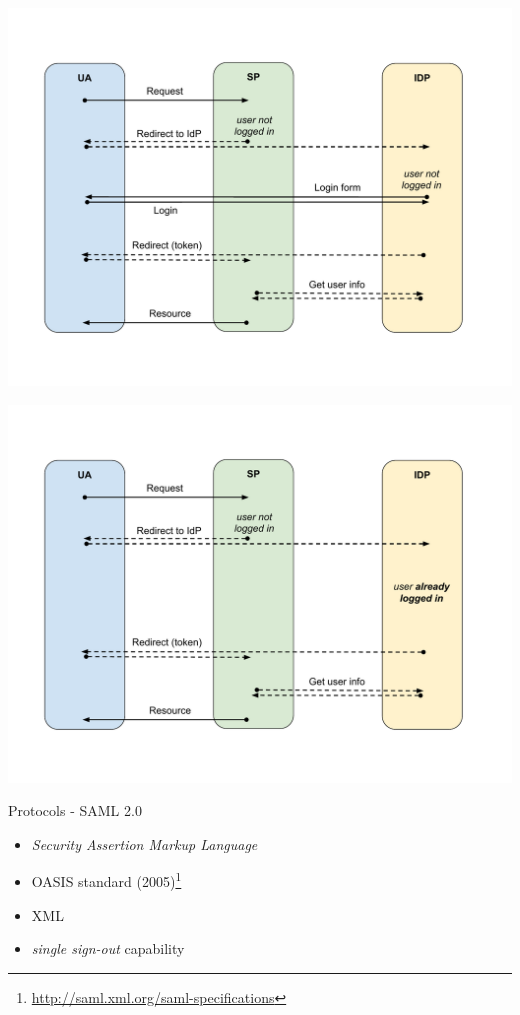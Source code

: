 \documentclass[ignorenonframetext,aspectratio=169]{beamer}
\providecommand{\tightlist}{%
  \setlength{\itemsep}{0pt}\setlength{\parskip}{0pt}}
\begin{document}
\begin{frame}[plain]
\centering
\includegraphics[height=\paperheight]{fedsso-proto-6.pdf}
\end{frame}

\begin{frame}[plain]
\centering
\includegraphics[height=\paperheight]{fedsso-proto-7.pdf}
\end{frame}

\begin{frame}{Protocols - SAML 2.0}
\begin{itemize}
\tightlist
\item \emph{Security Assertion Markup Language}
\item OASIS standard (2005)\footnote{
        \url{http://saml.xml.org/saml-specifications}}
\item XML
\item \emph{single sign-out} capability
\end{itemize}
\end{frame}
\end{document}
